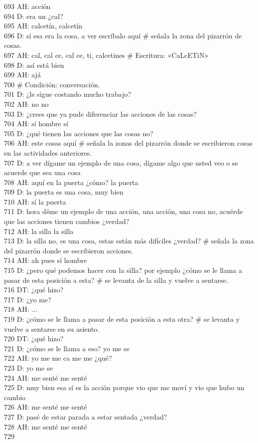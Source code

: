 693 AH: acción\\
694 D: era un ¿cal?\\
695 AH: calcetín, calcetín\\
696 D: sí esa era la cosa, a ver escríbalo aquí \# señala la zona del pizarrón de cosas.\\
697 AH: cal, cal ce, cal ce, ti, calcetines \# Escritura: «CaLcETiN»\\
698 D: así está bien\\
699 AH: ajá\\
700 \# Condición: conversación.\\
701 D: ¿le sigue costando mucho trabajo?\\
702 AH: no no\\
703 D: ¿crees que ya pude diferenciar las acciones de las cosas?\\
704 AH: sí hombre sí\\
705 D: ¿qué tienen las acciones que las cosas no?\\
706 AH: este cosas aquí \# señala la zonas del pizarrón donde se escribieron cosas en las actividades anteriores.\\
707 D: a ver dígame un ejemplo de una cosa, dígame algo que usted veo o se acuerde que sea una cosa\\
708 AH: aquí en la puerta ¿cómo? la puerta\\
709 D: la puerta es una cosa, muy bien\\
710 AH: sí la puerta\\
711 D: hora déme un ejemplo de una acción, una acción, una cosa no, acuérde que las acciones tienen cambios ¿verdad?\\
712 AH: la silla la silla\\
713 D: la silla no, es una cosa, estas están más difíciles ¿verdad? \# señala la zona del pizarrón donde se escribieron acciones.\\
714 AH: ah pues sí hombre\\
715 D: ¿pero qué podemos hacer con la silla? por ejemplo ¿cómo se le llama a pasar de esta posición a esta? \# se levanta de la silla y vuelve a sentarse.\\
716 DT: ¿qué hizo?\\
717 D: ¿yo me?\\
718 AH: ...\\
719 D: ¿cómo se le llama a pasar de esta posición a esta otra? \# se levanta y vuelve a sentarse en su asiento.\\
720 DT: ¿qué hizo?\\
721 D: ¿cómo se le llama a eso? yo me se\\
722 AH: yo me me ca me me ¿qué?\\
723 D: yo me se\\
724 AH: me senté me senté\\
725 D: muy bien esa sí es la acción porque vio que me moví y vio que hubo un cambio\\
726 AH: me senté me senté\\
727 D: pasé de estar parada a estar sentada ¿verdad?\\
728 AH: me senté me senté\\
729 \\
